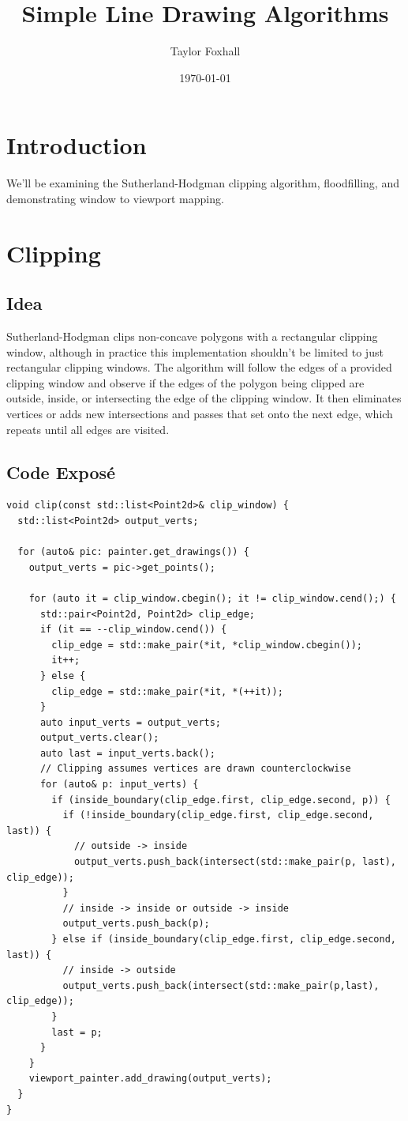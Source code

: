 \documentclass{article}
\author{Taylor Foxhall}
\date{\today}
\title{Simple Line Drawing Algorithms}
\begin{document}
\maketitle

\section{Introduction}
\label{sec:orgheadline1}
We'll be examining the Sutherland-Hodgman clipping algorithm, floodfilling, and demonstrating window to viewport mapping.
\section{Clipping}
\label{sec:orgheadline4}
\subsection{Idea}
\label{sec:orgheadline2}
Sutherland-Hodgman clips non-concave polygons with a rectangular clipping window, although in practice this implementation
shouldn't be limited to just rectangular clipping windows. The algorithm will follow the edges of a provided clipping window
and observe if the edges of the polygon being clipped are outside, inside, or intersecting the edge of the clipping window.
It then eliminates vertices or adds new intersections and passes that set onto the next edge, which repeats until all edges
are visited.
\subsection{Code Exposé}
\label{sec:orgheadline3}
\begin{verbatim}
void clip(const std::list<Point2d>& clip_window) {
  std::list<Point2d> output_verts;

  for (auto& pic: painter.get_drawings()) {
    output_verts = pic->get_points();

    for (auto it = clip_window.cbegin(); it != clip_window.cend();) {
      std::pair<Point2d, Point2d> clip_edge;
      if (it == --clip_window.cend()) {
        clip_edge = std::make_pair(*it, *clip_window.cbegin());
        it++;
      } else {
        clip_edge = std::make_pair(*it, *(++it));
      }
      auto input_verts = output_verts;
      output_verts.clear();
      auto last = input_verts.back();
      // Clipping assumes vertices are drawn counterclockwise
      for (auto& p: input_verts) {
        if (inside_boundary(clip_edge.first, clip_edge.second, p)) {
          if (!inside_boundary(clip_edge.first, clip_edge.second, last)) {
            // outside -> inside
            output_verts.push_back(intersect(std::make_pair(p, last), clip_edge));
          }
          // inside -> inside or outside -> inside
          output_verts.push_back(p);
        } else if (inside_boundary(clip_edge.first, clip_edge.second, last)) {
          // inside -> outside
          output_verts.push_back(intersect(std::make_pair(p,last), clip_edge));
        }
        last = p;
      }
    }
    viewport_painter.add_drawing(output_verts);
  }
}
\end{verbatim}
\end{document}
